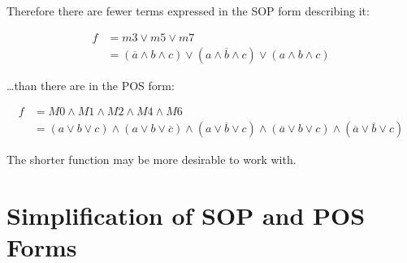 \documentclass[10pt]{article}
\begin{document}
Therefore there are fewer terms expressed in the SOP form describing it:

\begin{align}
f & = m3 \lor m5 \lor m7 \\
&= (\overline{a} \land b \land c) \lor
	(a \land \overline{b} \land c) \lor
	(a \land b \land c)						\label{eqn:sop:example}
\end{align}


\ldots{}than there are in the POS form:

\begin{align}
f &= M0 \land M1 \land M2 \land M4 \land M6 \\
&= (a \lor b \lor c) \land
	(a \lor b \lor \overline{c}) \land
	(a \lor \overline{b} \lor c) \land
	(\overline{a} \lor b \lor c) \land
	(\overline{a} \lor \overline{b} \lor c)
\end{align}



The shorter function may be more desirable to work with.

\section{Simplification of SOP and POS Forms}
\end{document}
